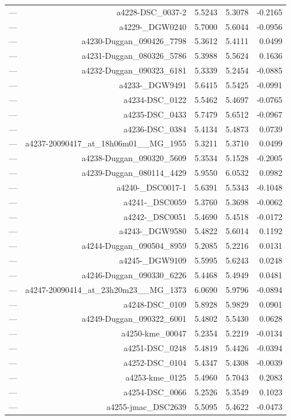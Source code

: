 \begin{table}[htbp]
\begin{tabular}{lrrrr}
— & a4228-DSC_0037-2 & 5.5243 & 5.3078 & -0.2165 \\
— & a4229-_DGW0240 & 5.7000 & 5.6044 & -0.0956 \\
— & a4230-Duggan_090426_7798 & 5.3612 & 5.4111 & 0.0499 \\
— & a4231-Duggan_080326_5786 & 5.3988 & 5.5624 & 0.1636 \\
— & a4232-Duggan_090323_6181 & 5.3339 & 5.2454 & -0.0885 \\
— & a4233-_DGW9491 & 5.6415 & 5.5425 & -0.0991 \\
— & a4234-DSC_0122 & 5.5462 & 5.4697 & -0.0765 \\
— & a4235-DSC_0433 & 5.7479 & 5.6512 & -0.0967 \\
— & a4236-DSC_0384 & 5.4134 & 5.4873 & 0.0739 \\
— & a4237-20090417_at_18h06m01__MG_1955 & 5.3211 & 5.3710 & 0.0499 \\
— & a4238-Duggan_090320_5609 & 5.3534 & 5.1528 & -0.2005 \\
— & a4239-Duggan_080114_4429 & 5.9550 & 6.0532 & 0.0982 \\
— & a4240-_DSC0017-1 & 5.6391 & 5.5343 & -0.1048 \\
— & a4241-_DSC0059 & 5.3760 & 5.3698 & -0.0062 \\
— & a4242-_DSC0051 & 5.4690 & 5.4518 & -0.0172 \\
— & a4243-_DGW9580 & 5.4822 & 5.6014 & 0.1192 \\
— & a4244-Duggan_090504_8959 & 5.2085 & 5.2216 & 0.0131 \\
— & a4245-_DGW9109 & 5.5995 & 5.6243 & 0.0248 \\
— & a4246-Duggan_090330_6226 & 5.4468 & 5.4949 & 0.0481 \\
— & a4247-20090414_at_23h20m23__MG_1373 & 6.0690 & 5.9796 & -0.0894 \\
— & a4248-DSC_0109 & 5.8928 & 5.9829 & 0.0901 \\
— & a4249-Duggan_090322_6001 & 5.4802 & 5.5430 & 0.0628 \\
— & a4250-kme_00047 & 5.2354 & 5.2219 & -0.0134 \\
— & a4251-DSC_0248 & 5.4819 & 5.4426 & -0.0394 \\
— & a4252-DSC_0104 & 5.4347 & 5.4308 & -0.0039 \\
— & a4253-kme_0125 & 5.4960 & 5.7043 & 0.2083 \\
— & a4254-DSC_0066 & 5.2526 & 5.3549 & 0.1023 \\
— & a4255-jmac_DSC2639 & 5.5095 & 5.4622 & -0.0473 \\

\end{tabular}
\end{table}
